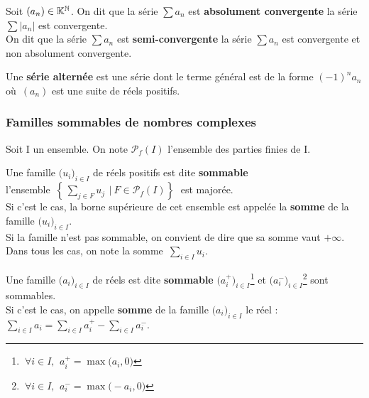 Soit \((a_n)\in \mathbb{K}^{\mathbb{N}}\). On dit que la série \(\sum a_n\) est \textbf{absolument convergente} \ssi la série \(\sum |a_n|\) est convergente.\vspace{0.2cm}\\
On dit que la série \(\sum a_n\) est \textbf{semi-convergente} \ssi la série \(\sum a_n\) est convergente et non absolument convergente.

\vspace{1cm}

Une \textbf{série alternée} est une série dont le terme général est de la forme \((-1)^na_n\,\) où \(\,(a_n)\) est une suite de réels positifs.

\vspace{1.5cm}


\subsubsection{Familles sommables de nombres complexes}

\vspace{1cm}

\begin{center}
    Soit I un ensemble. On note \(\mathcal{P}_f(I)\) l'ensemble des parties finies de I.
\end{center}

\vspace{1.3cm}

Une famille \(\bigl(u_i\bigr)_{i\in I}\) de réels positifs est dite \textbf{sommable} \ssi\vspace*{0.1cm}\\
l'ensemble \(\,\displaystyle\left\{\,\sum_{j\in F}u_j \ \,| \ F\in \mathcal{P}_f(I)\right\}\;\) est majorée.\vspace{0.1cm}\\
Si c'est le cas, la borne supérieure de cet ensemble est appelée la \textbf{somme} de la famille \(\bigl(u_i\bigr)_{i\in I}\).\\
Si la famille n'est pas sommable, on convient de dire que sa somme vaut $+\infty$.\\
Dans tous les cas, on note la somme \(\,\underset{i\in I}{\sum}u_i.\)

\vspace{1.3cm}

Une famille \(\bigl(a_i\bigr)_{i\in I}\) de réels est dite \textbf{sommable} \ssi \(\bigl(a^+_i\bigr)_{i\in I}\)\footnote{\(\ \forall i\in I,\ \, a^+_i=\max \bigl(a_i, 0\bigr)\)\vspace{0.2cm}} et \(\bigl(a^-_i\bigr)_{i\in I}\)\footnote{\(\ \forall i\in I,\ \, a^-_i=\max \bigl(-a_i, 0\bigr)\)} sont sommables.\vspace{0.1cm}\\
Si c'est le cas, on appelle \textbf{somme} de la famille \(\bigl(a_i\bigr)_{i\in I}\) le réel : \(\displaystyle \sum_{i\in I}a_i = \sum_{i\in I}a_i^+ -\sum_{i\in I}a_i^-. \)

